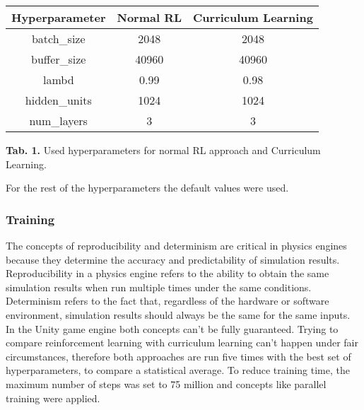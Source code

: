 \begin{center}
    \begin{tabular}{|c|c|c|}
        \rowcolor{gray!50}
        \hline
        \textbf{Hyperparameter} & \textbf{Normal RL} & \textbf{Curriculum Learning} \\ \hline
        batch\_size    & 2048      & 2048                \\ \hline
        buffer\_size   & 40960     & 40960               \\ \hline
        lambd          & 0.99      & 0.98                \\ \hline
        hidden\_units  & 1024      & 1024                \\ \hline
        num\_layers    & 3         & 3                   \\ \hline
    \end{tabular}
\end{center}
\begin{center}
    \vspace{10pt}
    \textbf{Tab. 1.} Used hyperparameters for normal RL approach and Curriculum Learning.
\end{center}
For the rest of the hyperparameters the default values were used.

\subsubsection{Training}
The concepts of reproducibility and determinism are critical in physics engines because they determine the accuracy and predictability of simulation results.
Reproducibility in a physics engine refers to the ability to obtain the same simulation results when run multiple times under the same conditions.
Determinism refers to the fact that, regardless of the hardware or software environment, simulation results should always be the same for the same inputs.
In the Unity game engine both concepts can't be fully guaranteed.
Trying to compare reinforcement learning with curriculum learning can't happen under fair circumstances, therefore both
approaches are run five times with the best set of hyperparameters, to compare a statistical average.
To reduce training time, the maximum number of steps was set to 75 million and concepts like parallel training were applied.



